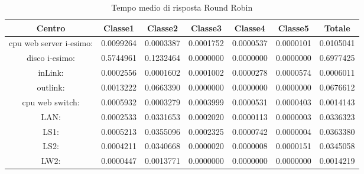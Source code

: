\begin{table}[H]
\begin{center}\begin{scriptsize}
\begin{tabular}{||c|c|c|c|c|c|c||}
\hline
Centro &Classe1 &Classe2 &Classe3 &Classe4 &Classe5 &Totale\\
\hline
\hline
 cpu web server i-esimo: 	&0.0099264	&0.0003387	&0.0001752	&0.0000537	&0.0000101	&0.0105041\\
\hline
 disco i-esimo: 	&0.5744961	&0.1232464	&0.0000000	&0.0000000	&0.0000000	&0.6977425\\
\hline
 inLink: 	&0.0002556	&0.0001602	&0.0001002	&0.0000278	&0.0000574	&0.0006011\\
\hline
 outlink: 	&0.0013222	&0.0663390	&0.0000000	&0.0000000	&0.0000000	&0.0676612\\
\hline
 cpu web switch: 	&0.0005932	&0.0003279	&0.0003999	&0.0000531	&0.0000403	&0.0014143\\
\hline
 LAN: 	&0.0002533	&0.0331653	&0.0002020	&0.0000113	&0.0000003	&0.0336323\\
\hline
 LS1: 	&0.0005213	&0.0355096	&0.0002325	&0.0000742	&0.0000004	&0.0363380\\
\hline
 LS2: 	&0.0004211	&0.0340668	&0.0000020	&0.0000008	&0.0000151	&0.0345058\\
\hline
 LW2: 	&0.0000447	&0.0013771	&0.0000000	&0.0000000	&0.0000000	&0.0014219\\
\hline
\end{tabular}
\end{scriptsize}\end{center}
\caption{Tempo medio di risposta Round Robin}
\label{tempomediorisposta}
\end{table}

